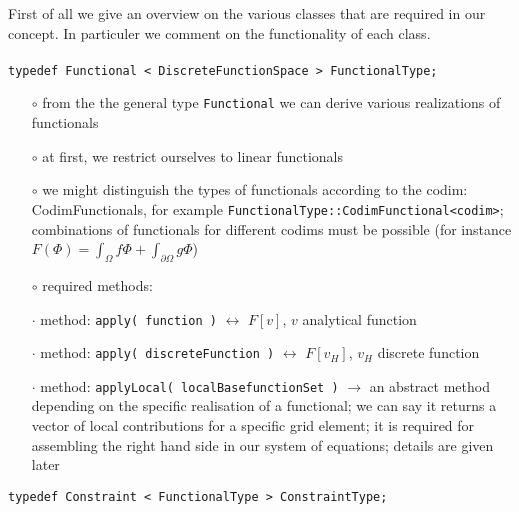 \documentclass[a4paper,11pt]{article}
\numberwithin{equation}{section}
\begin{document}
First of all we give an overview on the various classes that are required in our concept. In particuler we comment on the functionality of each class.\\
\\
{\tt typedef Functional < DiscreteFunctionSpace > FunctionalType;}
\begin{itemize}
\item[$\circ$] from the the general type {\tt Functional} we can derive various realizations of functionals
\item[$\circ$] at first, we restrict ourselves to linear functionals
\item[$\circ$] we might distinguish the types of functionals according to the codim: CodimFunctionals, for example {\tt FunctionalType::CodimFunctional<codim>}; combinations of functionals for different codims must be possible (for instance $F(\Phi) = \int_{\Omega} f \Phi + \int_{\partial \Omega} g \Phi$)
\item[$\circ$] required methods:
\item[$\cdot$] method: {\tt apply( function )} $\leftrightarrow$ $F[ v ]$, $v$ analytical function
\item[$\cdot$] method: {\tt apply( discreteFunction )} $\leftrightarrow$ $F[v_H]$, $v_H$ discrete function
\item[$\cdot$] method: {\tt applyLocal( localBasefunctionSet )} $\rightarrow$ an abstract method depending on the specific realisation of a functional; we can say it returns a vector of local contributions for a specific grid element; it is required for assembling the right hand side in our system of equations; details are given later
\end{itemize}
{\tt typedef Constraint < FunctionalType > ConstraintType;}
\end{document}
